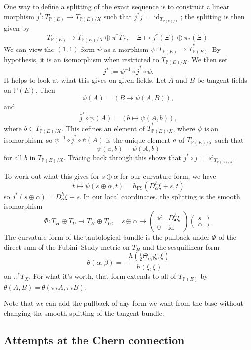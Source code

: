 \documentclass[11pt]{article}
\newcommand{\kk}[1]{\mathbb{#1}}
\DeclareMathOperator{\id}{id}
\begin{document}
One way to define a splitting of the exact sequence is to construct a linear morphism $j^* : T_{\kk P(E)} \to T_{\kk P(E)/X}$ such that $j^* j = \id_{T_{\kk P(E)/X}}$; the splitting is then given by
$$
T_{\kk P(E)} \to T_{\kk P(E)/X} \oplus \pi^*T_X,
\quad
\Xi \mapsto j^*(\Xi) \oplus \pi_*(\Xi).
$$
We can view the $(1,1)$-form $\psi$ as a morphism $\psi : T_{\kk P(E)} \to \overline{T}_{\kk P(E)}^*$. By hypothesis, it is an isomorphism when restricted to $T_{\kk P(E)/X}$. We then set
$$
j^* := \psi^{-1} \circ \bar{j}^* \circ \psi.
$$
It helps to look at what this gives on given fields. Let $A$ and $B$ be tangent fields on $\kk P(E)$. Then
$$
\psi(A) = (B \mapsto \psi(A, B)),
$$
and
$$
\bar j^* \circ \psi(A) = (b \mapsto \psi(A, b)),
$$
where $b \in T_{\kk P(E)/X}$. This defines an element of $\overline T_{\kk P(E)/X}^*$, where $\psi$ is an isomorphism, so $\psi^{-1} \circ \bar j^* \circ \psi(A)$ is the unique element $a$ of $T_{\kk P(E)/X}$ such that
$$
\psi(a, b) = \psi(A, b)
$$
for all $b$ in $T_{\kk P(E)/X}$. Tracing back through this shows that $j^* \circ j = \id_{T_{\kk P(E)/X}}$.

To work out what this gives for $s \oplus \alpha$ for our curvature form, we have
$$
t \mapsto \psi(s \oplus \alpha, t) = h_{\mathrm{FS}}(D^h_\alpha \xi + s, t)
$$
so $j^*(s \oplus \alpha) = D^h_\alpha \xi + s$. In our local coordinates, the splitting is the smooth isomorphism
$$
\Phi: T_H \oplus T_U \to T_H \oplus T_U,
\quad
s \oplus \alpha
\mapsto
\begin{pmatrix}
  \id & D^h_\bullet \xi
  \\
  0 & \id
\end{pmatrix}
\begin{pmatrix}
  s \\ \alpha
\end{pmatrix}.
$$
The curvature form of the tautological bundle is the pullback under $\Phi$ of the direct sum of the Fubini--Study metric on $T_H$ and the sesquilinear form
$$
\theta(\alpha, \beta) = -\frac{h(\frac i2\Theta_{\alpha\beta}\xi, \xi)}{h(\xi,\xi)}
$$
on $\pi^*T_X$. For what it's worth, that form extends to all of $T_{\kk P(E)}$ by $\theta(A, B) = \theta(\pi_*A, \pi_*B)$.

Note that we can add the pullback of any form we want from the base without changing the smooth splitting of the tangent bundle.

\subsection{Attempts at the Chern connection}
\end{document}
